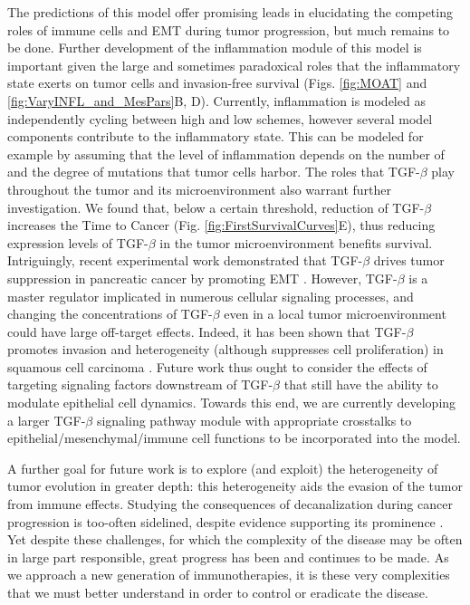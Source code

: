 \documentclass[11pt]{article}
\begin{document}
The predictions of this model offer promising leads in elucidating the competing roles of immune cells and EMT during tumor progression, but much remains to be done. Further development of the inflammation module of this model is important given the large and sometimes paradoxical roles that the inflammatory state exerts on tumor cells and invasion-free survival (Figs. \ref{fig:MOAT} and \ref{fig:VaryINFL_and_MesPars}B, D). Currently, inflammation is modeled as independently cycling between high and low schemes, however several model components contribute to the inflammatory state. This can be modeled for example by assuming that the level of inflammation depends on the number of and the degree of mutations that tumor cells harbor.
The roles that TGF-$\beta$ play throughout the tumor and its microenvironment also warrant further investigation. We found that, below a certain threshold, reduction of TGF-$\beta$ increases the Time to Cancer  (Fig. \ref{fig:FirstSurvivalCurves}E), thus reducing expression levels of TGF-$\beta$ in the tumor microenvironment benefits survival. Intriguingly, recent experimental work demonstrated that TGF-$\beta$ drives tumor suppression in pancreatic cancer by promoting EMT \cite{david16_tgfv}. However, TGF-$\beta$ is a master regulator implicated in numerous cellular signaling processes, and changing the concentrations of TGF-$\beta$ even in a local tumor microenvironment could have large off-target effects. Indeed, it has been shown that TGF-$\beta$ promotes invasion and heterogeneity (although suppresses cell proliferation) in squamous cell carcinoma \cite{oshimori15_tgfv}. Future work thus ought to consider the effects of targeting signaling factors downstream of TGF-$\beta$ that still have the ability to modulate epithelial cell dynamics. Towards this end, we are currently developing a larger TGF-$\beta$ signaling pathway module with appropriate crosstalks to  epithelial/mesenchymal/immune cell functions to be incorporated into the model.
\par
A further goal for future work is to explore (and exploit) the heterogeneity of tumor evolution in greater depth: this heterogeneity aids the evasion of the tumor from immune effects. Studying the consequences of decanalization \cite{gibson09_decanalization} during cancer progression is too-often sidelined, despite evidence supporting its prominence \cite{cyll17_tumour, punt17_tumour, dagogo-jack18_tumour}. Yet despite these challenges, for which the complexity of the disease may be often in large part responsible, great progress has been and continues to be made. As we approach a new generation of immunotherapies, it is these very complexities that we must better understand in order to control or eradicate the disease.
\end{document}
